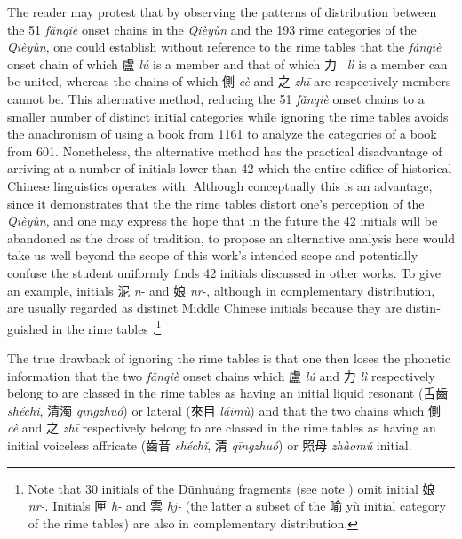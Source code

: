 The reader may protest that by observing the patterns of distribution
between the 51  \emph{fǎnqiè} onset chains in the  \emph{Qièyùn} and the
193 rime categories of the  \emph{Qièyùn}, one could establish without
reference to the rime tables that the  \emph{fǎnqiè} onset chain of which
盧 \emph{lú} is a member and that of which 力~ \emph{lì }is a member can
be united, whereas the chains of which 側 \emph{cè }and 之 \emph{zhī}
are respectively members cannot be. This al­ter­na­tive method, reducing
the 51  \emph{fǎnqiè} onset chains to a smaller number of distinct
initial cate­gories while ignoring the rime tables avoids the
anachronism of using a book from 1161 to analyze the categories of a
book from 601. Nonetheless, the alternative method has the practical
disadvantage of arriving at a number of initials lower than 42 which
the entire edifice of historical Chinese linguistics operates with.
Although conceptually this is an advantage, since it demonstrates that
the the rime tables distort one's perception of the  \emph{Qièyùn}, and
one may express the hope that in the future the 42 initials will be
abandoned as the dross of tradition, to propose an alternative analysis
here would take us well beyond the scope of this work's intended scope
and potentially confuse the student uniformly finds 42 initials
discussed in other works. To give an example, initials 泥 \emph{n}- and
娘 \emph{nr}-, although in com­ple­men­tary distribution, are usually
regarded as distinct Middle Chinese initials because they are
dis­tin­guished in the rime tables .\footnote{Note that 30
  initials of the Dūnhuáng fragments (see note ) omit initial 娘
  \emph{nr-}. Initials 匣 \emph{h-} and 雲 \emph{hj-} (the latter a
  subset of the 喻 yù initial category of the rime tables) are
  also in complementary distribution.}

The true drawback of ignoring the rime tables is that one then loses the
phonetic information that the two  \emph{fǎnqiè} onset chains which 盧
 \emph{lú} and 力 \emph{lì} respectively belong to are classed in the
rime tables as having an initial liquid resonant (舌齒 \emph{shéchǐ},
清濁 \emph{qīngzhuó}) or lateral (來目  \emph{láimù}) and that the two
chains which 側 \emph{cè} and 之 \emph{zhī} respectively belong to are
classed in the rime tables as having an initial voiceless affricate
(齒音 \emph{shéchǐ}, 清 \emph{qīngzhuó}) or 照母  \emph{zhàomǔ} initial.

